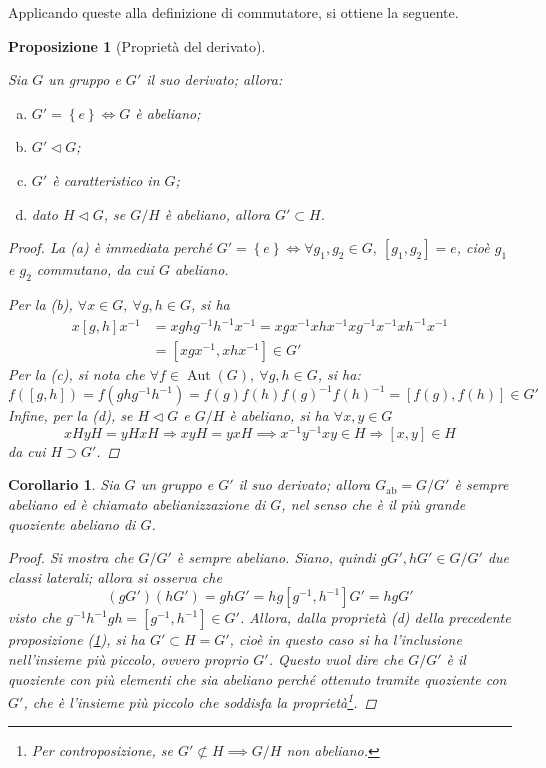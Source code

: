 \documentclass[12pt]{scrartcl}
\theoremstyle{style}
\newtheorem{prop}{Proposizione}[section]
\newtheorem{corollario}{Corollario}[teorema]
\numberwithin{equation}{subsection}
\begin{document}
Applicando queste alla definizione di commutatore, si ottiene la seguente.
\begin{prop}[Propriet\`a del derivato]\label{propderiv}
	
	Sia $G$ un gruppo e $G'$ il suo derivato; allora:
	\begin{enumerate}[(a).]
		\item $G ' = \left\{ e \right\}  \iff G$ \`e abeliano;
		\item $G' \lhd G$;
		\item $G'$ \`e caratteristico in $G$;
		\item dato $H \lhd G$, se $G / H$ \`e abeliano, allora $G' \subset H$.
	\end{enumerate}
	\begin{proof}
		La (a) \`e immediata perch\'e $G' = \left\{ e \right\} \iff \forall g_1,g_2 \in G, \ [g_1,g_2] = e $, cio\`e $g_1$ e $g_2$ commutano, da cui $G$ abeliano.

		Per la (b), $\forall x \in G, \ \forall g,h \in G $, si ha 
		\[
			\begin{split}
				x[g,h]x^{-1}  &= xghg^{-1}h^{-1}x^{-1}= xgx^{-1}xhx^{-1}xg^{-1}x^{-1}xh^{-1}x^{-1}\\
					      &=[xgx^{-1}, xhx^{-1}] \in G'
			\end{split}
		\] 
	Per la (c), si nota che $\forall f \in \operatorname{Aut} (G), \ \forall g,h \in G$, si ha:
	\[
		f([g,h]) = f(ghg^{-1}h^{-1}) = f(g) f(h) f(g)^{-1} f(h)^{-1} = [f(g), f(h)] \in G'
	\] 
	Infine, per la (d), se $H \lhd G$ e $G / H$ \`e abeliano, si ha $\forall x,y \in G$
	\[
		xHyH =yH xH\Rightarrow xyH = yxH \implies x^{-1}y^{-1}xy \in H \Rightarrow [x,y] \in H
	\] 
	da cui $H \supset G' $.
	\end{proof}
\end{prop}
\begin{corollario}
	Sia $G$ un gruppo e $G'$ il suo derivato; allora $G_\text{ab}= G / G'$ \`e sempre abeliano ed \`e chiamato \textit{abelianizzazione} di $G$, nel senso che \`e il pi\`u grande quoziente abeliano di $G$.
	\begin{proof}
		Si mostra che $G / G'$ \`e sempre abeliano. 
		Siano, quindi $gG', hG' \in G / G'$ due classi laterali; allora si osserva che
		\[
			(gG') (hG') = ghG' = hg [g^{-1},h^{-1}] G' = hg G'
		\] 
		visto che $g^{-1}h^{-1}gh=[g^{-1},h^{-1}] \in G'$.
		Allora, dalla propriet\`a (d) della precedente proposizione (\ref{propderiv}), si ha $G' \subset H =G'$, cio\`e in questo caso si ha l'inclusione nell'insieme pi\`u piccolo, ovvero proprio $G'$. 
		Questo vuol dire che $G /G'$ \`e il quoziente con pi\`u elementi che sia abeliano perch\'e ottenuto tramite quoziente con $G'$, che \`e l'insieme pi\`u piccolo che soddisfa la propriet\`a\footnote{Per controposizione, se $G'\not\subset H\implies G/H$ non abeliano.}.
	\end{proof}
\end{corollario}
\end{document}
